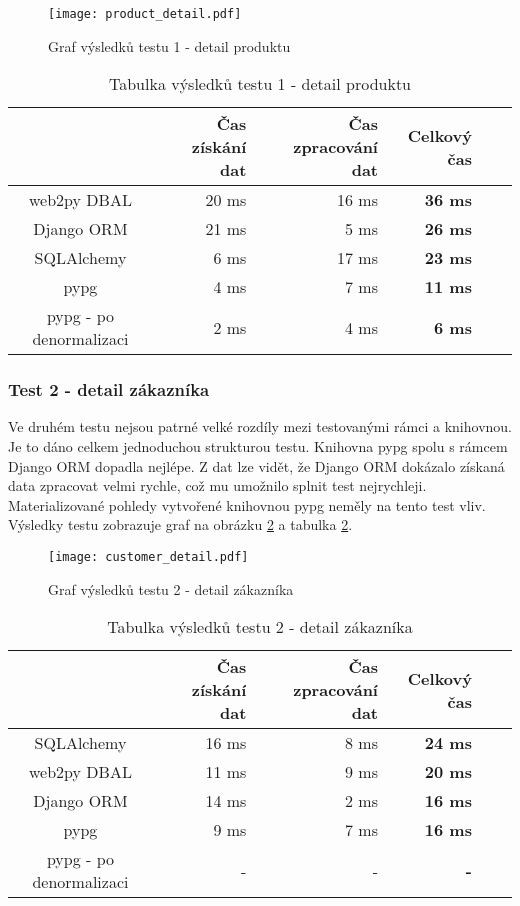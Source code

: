 \documentclass[ing,male,java,dept456]{diploma}						%
\begin{document}
\begin{figure}[h!]
    \centering
    \texttt{[image: product\_detail.pdf]}
    \caption{Graf výsledků testu 1 - detail produktu}
    \label{fig:TestPD}
\end{figure}

\begin{table}[h!]
  \centering
  \begin{tabular}{|c|r|r|r|r|r|}
    \hline
    & Čas získání dat & Čas zpracování dat & \textbf{Celkový čas} \\
    \hline
    web2py DBAL & 20 ms & 16 ms & \textbf{36 ms} \\
    \hline
    Django ORM & 21 ms & 5 ms & \textbf{26 ms} \\
    \hline
    SQLAlchemy & 6 ms & 17 ms & \textbf{23 ms} \\
    \hline
    pypg & 4 ms & 7 ms & \textbf{11 ms} \\
    \hline
    pypg - po denormalizaci & 2 ms & 4 ms & \textbf{6 ms} \\
    \hline
  \end{tabular}
  \caption{Tabulka výsledků testu 1 - detail produktu}
  \label{tab:TestPD}
\end{table}

\subsubsection{Test 2 - detail zákazníka}
Ve druhém testu nejsou patrné velké rozdíly mezi testovanými rámci a knihovnou. Je to dáno celkem jednoduchou strukturou testu. Knihovna pypg spolu s rámcem Django ORM dopadla nejlépe. Z dat lze vidět, že Django ORM dokázalo získaná data zpracovat velmi rychle, což mu umožnilo splnit test nejrychleji. Materializované pohledy vytvořené knihovnou pypg neměly na tento test vliv. Výsledky testu zobrazuje graf na obrázku \ref{fig:TestCD} a tabulka \ref{tab:TestCD}.

\begin{figure}[h!]
    \centering
    \texttt{[image: customer\_detail.pdf]}
    \caption{Graf výsledků testu 2 - detail zákazníka}
    \label{fig:TestCD}
\end{figure}
\begin{table}[h!]
  \centering
  \begin{tabular}{|c|r|r|r|r|r|}
    \hline
    & Čas získání dat & Čas zpracování dat & \textbf{Celkový čas} \\
    \hline
    SQLAlchemy & 16 ms & 8 ms & \textbf{24 ms} \\
    \hline
    web2py DBAL & 11 ms & 9 ms & \textbf{20 ms} \\
    \hline
    Django ORM & 14 ms & 2 ms & \textbf{16 ms} \\
    \hline
    pypg & 9 ms & 7 ms & \textbf{16 ms} \\
    \hline
    pypg - po denormalizaci & - & - & \textbf{-} \\
    \hline
  \end{tabular}
  \caption{Tabulka výsledků testu 2 - detail zákazníka}
  \label{tab:TestCD}
\end{table}
\end{document}
